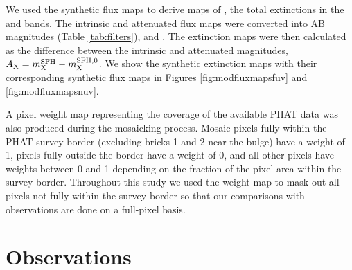 \documentclass[iop, tighten]{emulateapj}
\begin{document}
We used the synthetic flux maps to derive maps of \ax{}, the total extinctions
in the \fuv{} and \nuv{} bands. The intrinsic and attenuated flux maps were
converted into AB magnitudes (Table \ref{tab:filters}), \xsfhz{} and \xsfh{}.
The extinction maps were then calculated as the difference between the
intrinsic and attenuated magnitudes, $A_{\mathrm{X}} = m_{\mathrm{X}}^{\mathrm{SFH}} - m_{\mathrm{X}}^{\mathrm{SFH},0}$. We show the
synthetic extinction maps with their corresponding synthetic flux maps in
Figures \ref{fig:modfluxmapsfuv} and \ref{fig:modfluxmapsnuv}.

A pixel weight map representing the coverage of the available PHAT data was
also produced during the mosaicking process. Mosaic pixels fully within the
PHAT survey border (excluding bricks 1 and 2 near the bulge) have a weight of
1, pixels fully outside the border have a weight of 0, and all other pixels
have weights between 0 and 1 depending on the fraction of the pixel area within
the survey border. Throughout this study we used the weight map to mask out all
pixels not fully within the survey border so that our comparisons with
observations are done on a full-pixel basis.

%
%





\section{Observations}\label{observations}

\figfluxmapsfuv

\figfluxmapsnuv
\end{document}

